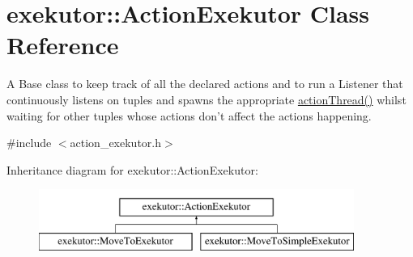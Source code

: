 \hypertarget{classexekutor_1_1ActionExekutor}{\section{exekutor\-:\-:\-Action\-Exekutor \-Class \-Reference}
\label{classexekutor_1_1ActionExekutor}
}


\-A \-Base class to keep track of all the declared actions and to run a \-Listener that continuously listens on tuples and spawns the appropriate \hyperlink{classexekutor_1_1ActionExekutor_ab80a1327f11113222157cfec0abd9e9b}{action\-Thread()} whilst waiting for other tuples whose actions don't affect the actions happening.  




{\ttfamily \#include $<$action\-\_\-exekutor.\-h$>$}

\-Inheritance diagram for exekutor\-:\-:\-Action\-Exekutor\-:\begin{figure}[H]
\begin{center}
\leavevmode
\includegraphics[height=2.000000cm]{classexekutor_1_1ActionExekutor}
\end{center}
\end{figure}
